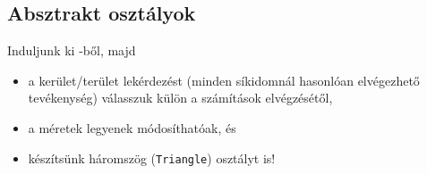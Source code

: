 \subsection{Absztrakt osztályok}

\begin{frame}
    Induljunk ki -ből, majd 
    \begin{itemize}
        \item a kerület/terület lekérdezést (minden síkidomnál hasonlóan elvégezhető tevékenység) válasszuk külön a számítások elvégzésétől,
        \item a méretek legyenek módosíthatóak, és
        \item készítsünk háromszög (\texttt{Triangle}) osztályt is!
    \end{itemize}
\end{frame}    
     
\begin{frame}
    \begin{columns}[T]
            \begin{exampleblock}{}
                \scriptsize
                
            \end{exampleblock}
            \begin{exampleblock}{}
                \scriptsize
                
            \end{exampleblock}
    \end{columns}
\end{frame}

\begin{frame}
    \begin{columns}[T]
            \begin{exampleblock}{}
                \scriptsize
                
            \end{exampleblock}
            \begin{exampleblock}{}
                \scriptsize
                
            \end{exampleblock}
    \end{columns}
\end{frame}

